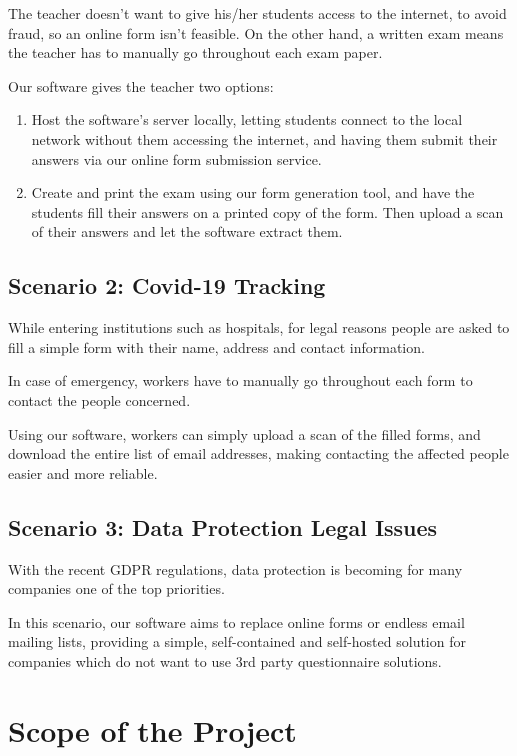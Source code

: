 \documentclass[12pt, a4paper]{report}
\begin{document}
The teacher doesn't want to give his/her students access to the internet, to avoid fraud, so an online form isn't feasible. On the other hand, a written exam means the teacher has to manually go throughout each exam paper.

Our software gives the teacher two options:
\begin{enumerate}
    \item Host the software's server locally, letting students connect to the local network without them accessing the internet, and having them submit their answers via our online form submission service.
    \item Create and print the exam using our form generation tool, and have the students fill their answers on a printed copy of the form. Then upload a scan of their answers and let the software extract them.
\end{enumerate}

\subsection*{Scenario 2: Covid-19 Tracking}

While entering institutions such as hospitals, for legal reasons people are asked to fill a simple form with their name, address and contact information.

In case of emergency, workers have to manually go throughout each form to contact the people concerned.

Using our software, workers can simply upload a scan of the filled forms, and download the entire list of email addresses, making contacting the affected people easier and more reliable.

\subsection*{Scenario 3: Data Protection Legal Issues}

With the recent GDPR regulations, data protection is becoming for many companies one of the top priorities.

In this scenario, our software aims to replace online forms or endless email mailing lists, providing a simple, self-contained and self-hosted solution for companies which do not want to use 3rd party questionnaire solutions.

\section{Scope of the Project}
\end{document}
